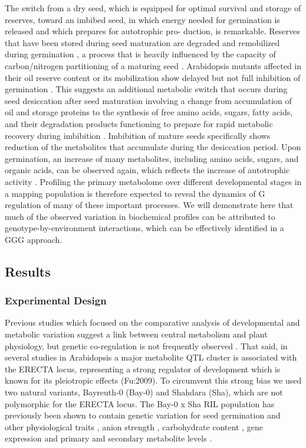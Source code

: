 The switch from a dry seed, which is equipped for optimal survival and storage of reserves, toward an
imbibed seed, in which energy needed for germination is released and which prepares for autotrophic pro-
duction, is remarkable. Reserves that have been stored during seed maturation are degraded and remobilized
during germination \cite{Bewley:1997,Shu:2008}, a process that is heavily influenced by the capacity 
of carbon/nitrogen partitioning of a maturing seed \cite{Dowdle:2007}. Arabidopsis mutants affected 
in their oil reserve content or its mobilization show delayed but not full inhibition of germination 
\cite{Kinnersley:2000, Bouche:2004, Shu:2008, Kelly:2011}. This suggests 
an additional metabolic switch that occurs during seed desiccation after seed maturation involving a change 
from accumulation of oil and storage proteins to the synthesis of free amino acids, sugars, fatty acids, 
and their degradation products functioning to prepare for rapid metabolic recovery during imbibition 
\cite{Fait:2006, Angelovici:2010}. Imbibition of mature seeds specifically shows reduction of 
the metabolites that accumulate during the desiccation period. Upon germination, an increase of many 
metabolites, including amino acids, sugars, and organic acids, can be observed again, which reflects 
the increase of autotrophic activity \cite{Fait:2006}. Profiling the primary metabolome over different 
developmental stages in a mapping population is therefore expected to reveal the dynamics of G regulation 
of many of these important processes. We will demonstrate here that much of the observed variation in 
biochemical profiles can be attributed to genotype-by-environment interactions, which can be effectively 
identified in a GGG approach.

\subsection{Results}

\subsubsection{Experimental Design}
Previous studies which focused on the comparative analysis of developmental and metabolic variation suggest 
a link between central metabolism and plant physiology, but genetic co-regulation is not frequently observed 
\cite{Keurentjes:2006, Meyer:2007}.  That said, in several studies in Arabidopsis a major 
metabolite QTL cluster is associated with the ERECTA locus, representing a strong regulator of development 
which is known for its pleiotropic effects (Fu:2009). To circumvent this strong bias we used two 
natural variants, Bayreuth-0 (Bay-0) and Shahdara (Sha), which are not polymorphic for the ERECTA locus. 
The Bay-0 x Sha RIL population \cite{Loudet:2002} has previously been shown to contain genetic variation 
for seed germination \cite{Joosen:2011} and other physiological traits \cite{Loudet:2003a, Barriere:2005, 
Loudet:2005, Diaz:2006, Reymond:2006, Loudet:2008, Meng:2008}, anion strength 
\cite{Loudet:2003a}, carbohydrate content \cite{Calenge:2006}, gene expression \cite{West:2007} and primary 
\cite{Rowe:2008} and secondary metabolite levels \cite{Wentzell:2007}. 


